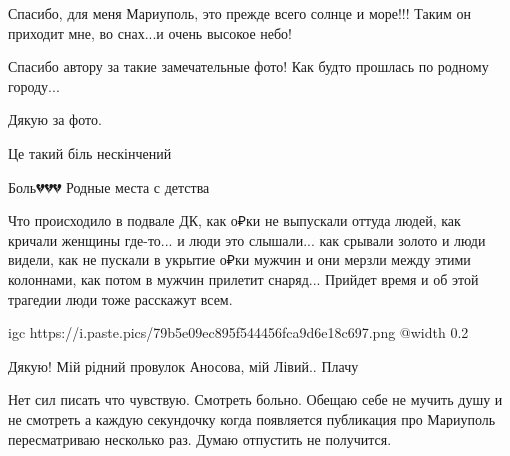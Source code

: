  
 
 
 
 

\qqSecCmt


Спасибо, для меня Мариуполь, это прежде всего солнце и море!!! Таким он
приходит мне, во снах...и очень высокое небо!


Спасибо автору за такие замечательные фото! Как будто прошлась по родному городу...


Дякую за фото.

Це такий біль нескінчений


Боль💔💔💔 Родные места с детства 🥺😪


Что происходило в подвале ДК, как о₽ки не выпускали оттуда людей, как кричали
женщины где-то... и люди это слышали... как срывали золото и люди видели, как
не пускали в укрытие о₽ки мужчин и они мерзли между этими колоннами, как потом
в мужчин прилетит снаряд... Прийдет время и об этой трагедии люди тоже
расскажут всем.


\ifcmt
  igc https://i.paste.pics/79b5e09ec895f544456fca9d6e18c697.png
	@width 0.2
\fi


Дякую! Мій рідний провулок Аносова, мій Лівий.. Плачу


Нет сил писать что чувствую. Смотреть больно. Обещаю себе не мучить душу и не
смотреть а каждую секундочку когда появляется публикация про Мариуполь
пересматриваю несколько раз. Думаю отпустить не получится.
